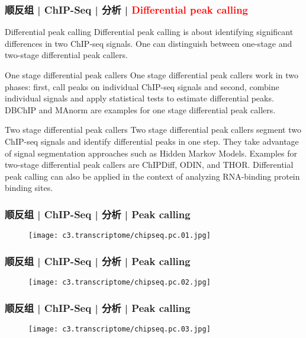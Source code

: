 \begin{frame}
  \frametitle{顺反组 | ChIP-Seq | 分析 | \textcolor{red}{Differential peak calling}}
  {\footnotesize
  \begin{block}{Differential peak calling}
  Differential peak calling is about identifying significant differences in two ChIP-seq signals. One can distinguish between one-stage and two-stage differential peak callers.
  \end{block}
  \pause
  \begin{block}{One stage differential peak callers}
    One stage differential peak callers work in two phases: first, call peaks on individual ChIP-seq signals and second, combine individual signals and apply statistical tests to estimate differential peaks. DBChIP and MAnorm are examples for one stage differential peak callers.
  \end{block}
  \pause
  \begin{block}{Two stage differential peak callers}
 Two stage differential peak callers segment two ChIP-seq signals and identify differential peaks in one step. They take advantage of signal segmentation approaches such as Hidden Markov Models. Examples for two-stage differential peak callers are ChIPDiff, ODIN, and THOR. Differential peak calling can also be applied in the context of analyzing RNA-binding protein binding sites. 
  \end{block}
  }
\end{frame}

\begin{frame}
  \frametitle{顺反组 | ChIP-Seq | 分析 | Peak calling}
  \begin{figure}
    \centering
    \texttt{[image: c3.transcriptome/chipseq.pc.01.jpg]}
  \end{figure}
\end{frame}

\begin{frame}
  \frametitle{顺反组 | ChIP-Seq | 分析 | Peak calling}
  \begin{figure}
    \centering
    \texttt{[image: c3.transcriptome/chipseq.pc.02.jpg]}
  \end{figure}
\end{frame}

\begin{frame}
  \frametitle{顺反组 | ChIP-Seq | 分析 | Peak calling}
  \begin{figure}
    \centering
    \texttt{[image: c3.transcriptome/chipseq.pc.03.jpg]}
  \end{figure}
\end{frame}

